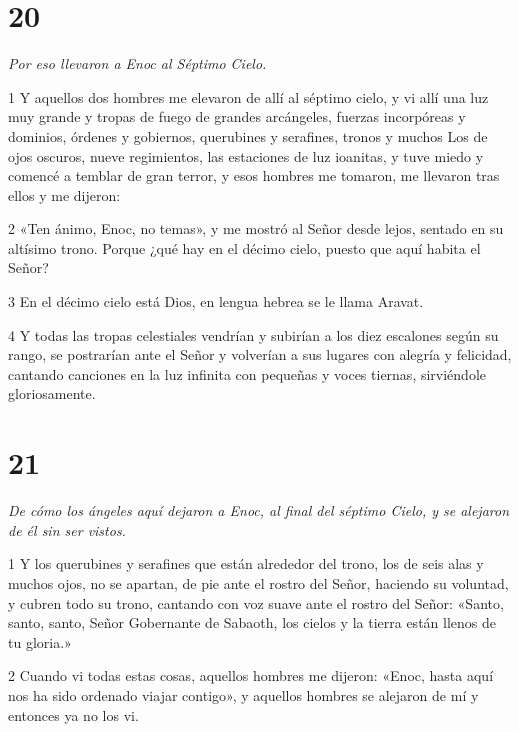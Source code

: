 \chapter{20}

\par \textit{Por eso llevaron a Enoc al Séptimo Cielo.}

\par 1 Y aquellos dos hombres me elevaron de allí al séptimo cielo, y vi allí una luz muy grande y tropas de fuego de grandes arcángeles, fuerzas incorpóreas y dominios, órdenes y gobiernos, querubines y serafines, tronos y muchos Los de ojos oscuros, nueve regimientos, las estaciones de luz ioanitas, y tuve miedo y comencé a temblar de gran terror, y esos hombres me tomaron, me llevaron tras ellos y me dijeron:

\par 2 «Ten ánimo, Enoc, no temas», y me mostró al Señor desde lejos, sentado en su altísimo trono. Porque ¿qué hay en el décimo cielo, puesto que aquí habita el Señor?

\par 3 En el décimo cielo está Dios, en lengua hebrea se le llama Aravat.

\par 4 Y todas las tropas celestiales vendrían y subirían a los diez escalones según su rango, se postrarían ante el Señor y volverían a sus lugares con alegría y felicidad, cantando canciones en la luz infinita con pequeñas y voces tiernas, sirviéndole gloriosamente.

\chapter{21}

\par \textit{De cómo los ángeles aquí dejaron a Enoc, al final del séptimo Cielo, y se alejaron de él sin ser vistos.}

\par 1 Y los querubines y serafines que están alrededor del trono, los de seis alas y muchos ojos, no se apartan, de pie ante el rostro del Señor, haciendo su voluntad, y cubren todo su trono, cantando con voz suave ante el rostro del Señor: «Santo, santo, santo, Señor Gobernante de Sabaoth, los cielos y la tierra están llenos de tu gloria.»

\par 2 Cuando vi todas estas cosas, aquellos hombres me dijeron: «Enoc, hasta aquí nos ha sido ordenado viajar contigo», y aquellos hombres se alejaron de mí y entonces ya no los vi.

